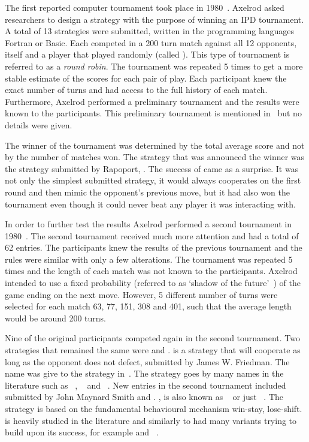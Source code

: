 The first reported computer tournament took place in 1980~\cite{Axelrod1980a}. 
Axelrod asked researchers to design a strategy with the purpose of winning an IPD
tournament. A
total of 13 strategies were submitted, written in the programming languages
Fortran or Basic. Each competed in a 200 turn match against all 12 opponents,
itself and a player that played randomly (called \Random). This type of
tournament is referred to as a \textit{round robin}. The tournament was repeated 5 times
to get a more stable estimate of the scores for each pair of play.
Each participant knew the exact number of turns and had access to the full
history of each match. Furthermore, Axelrod performed a preliminary tournament
and the results were known to the participants. This preliminary tournament is
mentioned in~\cite{Axelrod1980a} but no details were given.

The winner of the tournament was determined by the total average score and not
by the number of matches won. The strategy that was announced the winner was the
strategy submitted by Rapoport, \TitForTat. The success of \TitForTat
came as a surprise. It was not only the simplest submitted strategy, it would
always cooperates on the first round and then mimic the opponent's previous
move, but it had also won the tournament even though it could never beat
any player it was interacting with.

In order to further test the results Axelrod performed a second tournament
in 1980~\cite{Axelrod1980b}. The second tournament received much more attention
and had a total of 62 entries. The participants knew the results of the previous
tournament and the rules were similar with only a few alterations. The
tournament was repeated 5 times and the length of each match was not known to
the participants. Axelrod intended to use a fixed probability (referred to as
`shadow of the future'~\cite{Axelrod1988}) of the game ending on the next move.
However, 5 different number of turns were selected for each match 63, 77, 151,
308 and 401, such that the average length would be around 200 turns.

Nine of the original participants competed again in the second tournament. Two
strategies that remained the same were \TitForTat and \Grudger. \Grudger
is a strategy that will cooperate as long as the opponent does not defect,
submitted by James W. Friedman. The name \Grudger was give to the strategy
in~\cite{Li20142}. The strategy goes by many names in the literature such
as \Spite~\cite{Beaufils1997}, \GrimTrigger~\cite{Banks1990} and
\Grim~\cite{Van2015}. New entries in the second tournament included \TitforTwoTats
submitted by John Maynard Smith and \KPavlovC. \KPavlovC,
is also known as \Simpleton~\cite{rapoport1965} or just
\Pavlov~\cite{Nowak1993}. The strategy is based on the fundamental behavioural
mechanism win-stay, lose-shift. \Pavlov is heavily studied in the literature and
similarly to \TitForTat
had many variants trying to build upon its success, for example
\PavlovD and \AdaptivePavlov~\cite{Li2007}.

